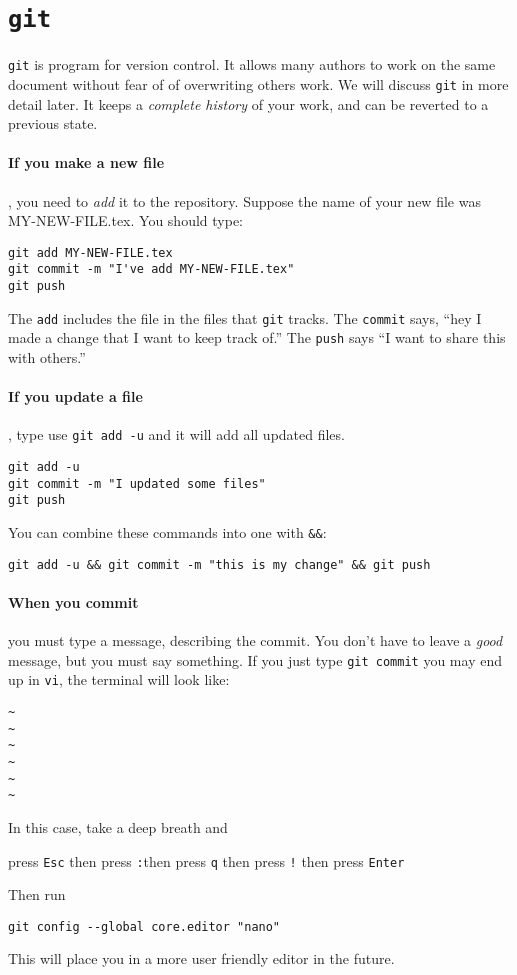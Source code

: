 \documentclass{ximera}
\begin{document}
\section{\texttt{git}}
\texttt{git} is program for version control. It allows many authors
to work on the same document without fear of
of overwriting others work. We will discuss \texttt{git} in more detail later.
It keeps a \textit{complete history} of your work, and can be reverted to a
previous state.

\paragraph{If you make a new file}, you need to \textit{add} it to the
repository. Suppose the name of your new file was MY-NEW-FILE.tex. You should
type:

\begin{verbatim}
git add MY-NEW-FILE.tex
git commit -m "I've add MY-NEW-FILE.tex"
git push
\end{verbatim}
The \verb!add! includes the file in the files that \verb!git! tracks. The
\verb!commit! says, ``hey I made a change that I want to keep track of.'' The
\verb!push! says ``I want to share this with others.''

\paragraph{If you update a file},
type use \verb!git add -u! and it will add all updated files.
\begin{verbatim}
git add -u
git commit -m "I updated some files"
git push
\end{verbatim}
You can combine these commands into one with \verb!&&!:
\begin{verbatim}
git add -u && git commit -m "this is my change" && git push
\end{verbatim}

\paragraph{When you commit} you must type a message, describing the commit. You
don't have to leave a \textit{good} message, but you must say something.
If you just type \verb!git commit! you may end up in \verb!vi!, the terminal
will look like:
\begin{verbatim}
~
~
~
~
~
~
\end{verbatim}
In this case, take a deep breath and
\begin{center}
      press \verb!Esc! \quad then press \verb!:!\quad then press \verb!q! \quad
      then
      press \verb#!# \quad then press \verb!Enter!
\end{center}
Then run
\begin{verbatim}
git config --global core.editor "nano"
\end{verbatim}
This will place you in a more user friendly editor in the future.
\end{document}
